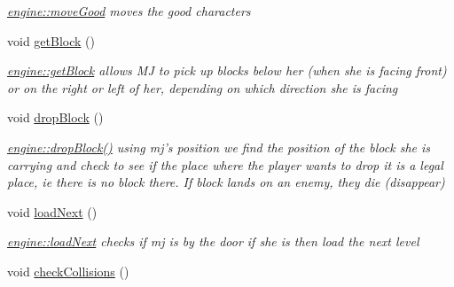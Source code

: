 \begin{DoxyCompactItemize}
\begin{DoxyCompactList}\small\item\em \hyperlink{classengine_ad010e22061b9a72eb0ff69821ffbfbc6}{engine\-::move\-Good} moves the good characters \end{DoxyCompactList}\item 
\hypertarget{classengine_a3fc3e6605e74eb8ba71316b15471a1c3}{void \hyperlink{classengine_a3fc3e6605e74eb8ba71316b15471a1c3}{get\-Block} ()}\label{classengine_a3fc3e6605e74eb8ba71316b15471a1c3}

\begin{DoxyCompactList}\small\item\em \hyperlink{classengine_a3fc3e6605e74eb8ba71316b15471a1c3}{engine\-::get\-Block} allows M\-J to pick up blocks below her (when she is facing front) or on the right or left of her, depending on which direction she is facing \end{DoxyCompactList}\item 
\hypertarget{classengine_ac37f50e0ee7aa83b113d8e4dbd9ee069}{void \hyperlink{classengine_ac37f50e0ee7aa83b113d8e4dbd9ee069}{drop\-Block} ()}\label{classengine_ac37f50e0ee7aa83b113d8e4dbd9ee069}

\begin{DoxyCompactList}\small\item\em \hyperlink{classengine_ac37f50e0ee7aa83b113d8e4dbd9ee069}{engine\-::drop\-Block()} using mj's position we find the position of the block she is carrying and check to see if the place where the player wants to drop it is a legal place, ie there is no block there. If block lands on an enemy, they die (disappear) \end{DoxyCompactList}\item 
\hypertarget{classengine_a56c6f2331fa2045f184b183c89f9c199}{void \hyperlink{classengine_a56c6f2331fa2045f184b183c89f9c199}{load\-Next} ()}\label{classengine_a56c6f2331fa2045f184b183c89f9c199}

\begin{DoxyCompactList}\small\item\em \hyperlink{classengine_a56c6f2331fa2045f184b183c89f9c199}{engine\-::load\-Next} checks if mj is by the door if she is then load the next level \end{DoxyCompactList}\item 
\hypertarget{classengine_a1fa4f5009e031570cd0e40d7056c8a61}{void \hyperlink{classengine_a1fa4f5009e031570cd0e40d7056c8a61}{check\-Collisions} ()}\label{classengine_a1fa4f5009e031570cd0e40d7056c8a61}


\end{DoxyCompactItemize}
